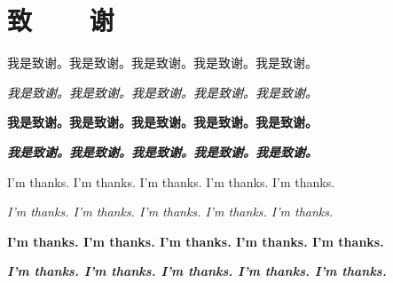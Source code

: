 \chapter{致~~~~谢}

我是致谢。我是致谢。我是致谢。我是致谢。我是致谢。

\textit{我是致谢。我是致谢。我是致谢。我是致谢。我是致谢。}

\textbf{我是致谢。我是致谢。我是致谢。我是致谢。我是致谢。}

\textbf{\textit{我是致谢。我是致谢。我是致谢。我是致谢。我是致谢。}}

I'm thanks. I'm thanks. I'm thanks. I'm thanks. I'm thanks.

\textit{I'm thanks. I'm thanks. I'm thanks. I'm thanks. I'm thanks.}

\textbf{I'm thanks. I'm thanks. I'm thanks. I'm thanks. I'm thanks.}

\textbf{\textit{I'm thanks. I'm thanks. I'm thanks. I'm thanks. I'm thanks.}}




\clearpage